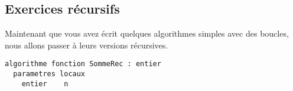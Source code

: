 \documentclass[11pt,a4paper]{article}
\begin{document}
\bigskip


\subsection{Exercices récursifs}

Maintenant que vous avez écrit quelques algorithmes simples avec des boucles, nous allons passer à leurs versions récursives.

\bigskip


\bigskip

\begin{table}[!ht]
  \centering
  \begin{minipage}{0.45\textwidth}
    \centering
\begin{lstlisting}[style=algorithmique]
algorithme fonction SommeRec : entier
  parametres locaux
    entier    n


\end{lstlisting}
\end{minipage}
\end{table}
\end{document}
